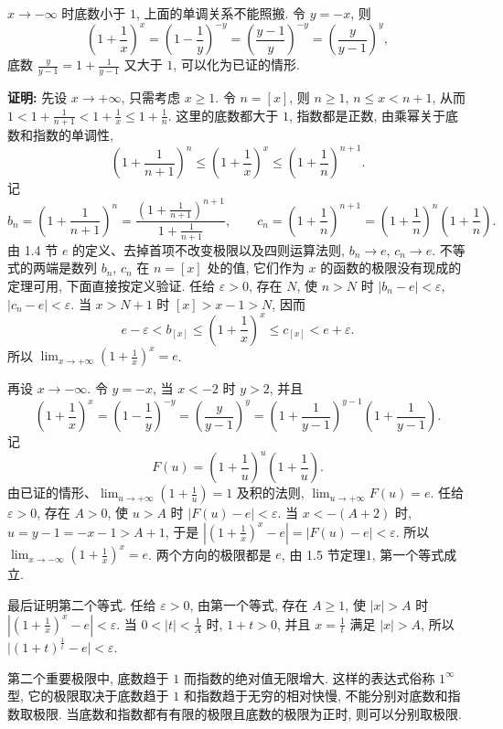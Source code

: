 \documentclass[UTF8,openany]{ctexbook}
\theoremstyle{chinesetextbook}
\newenvironment{cnproof}{\par\indent\textbf{证明:} \ignorespaces}{\par}
\begin{document}
$x\to-\infty$ 时底数小于 $1$, 上面的单调关系不能照搬. 令 $y=-x$, 则
\[
\left(1+\frac1x\right)^x=\left(1-\frac1y\right)^{-y}=\left(\frac{y-1}y\right)^{-y}=\left(\frac y{y-1}\right)^y,
\]
底数 $\displaystyle\frac y{y-1}=1+\frac1{y-1}$ 又大于 $1$, 可以化为已证的情形.
\begin{cnproof}
先设 $x\to+\infty$, 只需考虑 $x\ge1$. 令 $n=[x]$, 则 $n\ge1$, $n\le x<n+1$, 从而 $\displaystyle1<1+\frac1{n+1}<1+\frac1x\le1+\frac1n$. 这里的底数都大于 $1$, 指数都是正数, 由乘幂关于底数和指数的单调性,
\[
\left(1+\frac1{n+1}\right)^n\le\left(1+\frac1x\right)^x\le\left(1+\frac1n\right)^{n+1}.
\]
记
\[
b_n=\left(1+\frac1{n+1}\right)^n=\frac{\left(1+\frac1{n+1}\right)^{n+1}}{1+\frac1{n+1}},\qquad c_n=\left(1+\frac1n\right)^{n+1}=\left(1+\frac1n\right)^n\left(1+\frac1n\right).
\]
由 1.4 节 $e$ 的定义、去掉首项不改变极限以及四则运算法则, $b_n\to e$, $c_n\to e$. 不等式的两端是数列 $b_n$, $c_n$ 在 $n=[x]$ 处的值, 它们作为 $x$ 的函数的极限没有现成的定理可用, 下面直接按定义验证. 任给 $\varepsilon>0$, 存在 $N$, 使 $n>N$ 时 $|b_n-e|<\varepsilon$, $|c_n-e|<\varepsilon$. 当 $x>N+1$ 时 $[x]>x-1>N$, 因而
\[
e-\varepsilon<b_{[x]}\le\left(1+\frac1x\right)^x\le c_{[x]}<e+\varepsilon.
\]
所以 $\displaystyle\lim_{x\to+\infty}\left(1+\frac1x\right)^x=e$.

再设 $x\to-\infty$. 令 $y=-x$, 当 $x<-2$ 时 $y>2$, 并且
\[
\left(1+\frac1x\right)^x=\left(1-\frac1y\right)^{-y}=\left(\frac y{y-1}\right)^y=\left(1+\frac1{y-1}\right)^{y-1}\left(1+\frac1{y-1}\right).
\]
记
\[
F(u)=\left(1+\frac1u\right)^u\left(1+\frac1u\right).
\]
由已证的情形、$\displaystyle\lim_{u\to+\infty}\left(1+\frac1u\right)=1$ 及积的法则, $\displaystyle\lim_{u\to+\infty}F(u)=e$. 任给 $\varepsilon>0$, 存在 $A>0$, 使 $u>A$ 时 $|F(u)-e|<\varepsilon$. 当 $x<-(A+2)$ 时, $u=y-1=-x-1>A+1$, 于是 $\displaystyle\left|\left(1+\frac1x\right)^x-e\right|=|F(u)-e|<\varepsilon$. 所以 $\displaystyle\lim_{x\to-\infty}\left(1+\frac1x\right)^x=e$. 两个方向的极限都是 $e$, 由 1.5 节定理1, 第一个等式成立.

最后证明第二个等式. 任给 $\varepsilon>0$, 由第一个等式, 存在 $A\ge1$, 使 $|x|>A$ 时 $\displaystyle\left|\left(1+\frac1x\right)^x-e\right|<\varepsilon$. 当 $\displaystyle0<|t|<\frac1A$ 时, $1+t>0$, 并且 $\displaystyle x=\frac1t$ 满足 $|x|>A$, 所以 $\bigl|(1+t)^{\frac1t}-e\bigr|<\varepsilon$.
\end{cnproof}
第二个重要极限中, 底数趋于 $1$ 而指数的绝对值无限增大. 这样的表达式俗称 $1^\infty$ 型, 它的极限取决于底数趋于 $1$ 和指数趋于无穷的相对快慢, 不能分别对底数和指数取极限. 当底数和指数都有有限的极限且底数的极限为正时, 则可以分别取极限.
\end{document}
